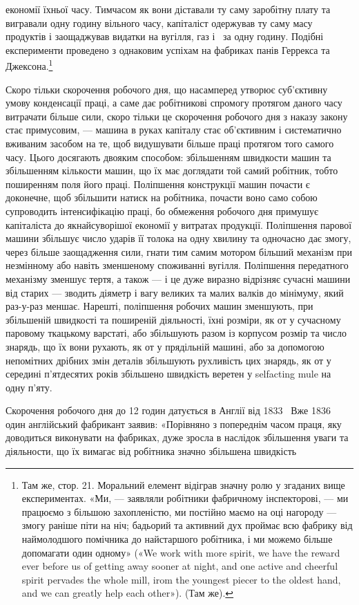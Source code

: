 \parcont{}  %
економії їхньої часу. Тимчасом як вони діставали ту саму заробітну
плату та вигравали одну годину вільного часу, капіталіст
одержував ту саму масу продуктів і заощаджував видатки на
вугілля, газ і~ за одну годину. Подібні експерименти проведено
з однаковим успіхам на фабриках панів Геррекса та
Джексона.\footnote{
Там же, стор. 21. Моральний елемент відіграв значну ролю у
згаданих вище експериментах. «Ми, — заявляли робітники фабричному
інспекторові, — ми працюємо з більшою захопленістю, ми постійно маємо
на оці нагороду — змогу раніше піти на ніч; бадьорий та активний
дух проймає всю фабрику від наймолодшого помічника до найстаршого
робітника, і ми можемо більше допомагати один одному» («We work with
more spirit, we have the reward ever before us of getting away sooner at
night, and one active and cheerful spirit pervades the whole mill, irom the
youngest piecer to the oldest hand, and we can greatly help each other»).
(Там же).
}

Скоро тільки скорочення робочого дня, що насамперед утворює
суб’єктивну умову конденсації праці, а саме дає робітникові
спромогу протягом даного часу витрачати більше сили, скоро
тільки це скорочення робочого дня з наказу закону стає примусовим,
— машина в руках капіталу стає об’єктивним і систематично
вживаним засобом на те, щоб видушувати більше праці
протягом того самого часу. Цього досягають двояким способом:
збільшенням швидкости машин та збільшенням кількости машин,
що їх має доглядати той самий робітник, тобто поширенням поля
його праці. Поліпшення конструкції машин почасти є доконечне,
щоб збільшити натиск на робітника, почасти воно само собою
супроводить інтенсифікацію праці, бо обмеження робочого дня
примушує капіталіста до якнайсуворішої економії у витратах
продукції. Поліпшення парової машини збільшує число ударів
її толока на одну хвилину та одночасно дає змогу, через більше
заощадження сили, гнати тим самим мотором більший механізм
при незмінному або навіть зменшеному споживанні вугілля.
Поліпшення передатного механізму зменшує тертя, а також — і це
дуже виразно відрізняє сучасні машини від старих — зводить
діяметр і вагу великих та малих валків до мінімуму, який раз-у-раз
меншає. Нарешті, поліпшення робочих машин зменшують,
при збільшеній швидкості та поширеній діяльності, їхні розміри,
як от у сучасному паровому ткацькому варстаті, або збільшують
разом із корпусом розмір та число знарядь, що їх вони рухають,
як от у прядільній машині, або за допомогою непомітних дрібних
змін деталів збільшують рухливість цих знарядь, як от у середині
п’ятдесятих років збільшено швидкість веретен у selfacting mule
на одну п’яту.

Скорочення робочого дня до 12 годин датується в Англії від
1833~ Вже 1836~ один англійський фабрикант заявив: «Порівняно
з попереднім часом праця, яку доводиться виконувати на
фабриках, дуже зросла в наслідок збільшення уваги та діяльности,
що їх вимагає від робітника значно збільшена швидкість
\parbreak{}  %
